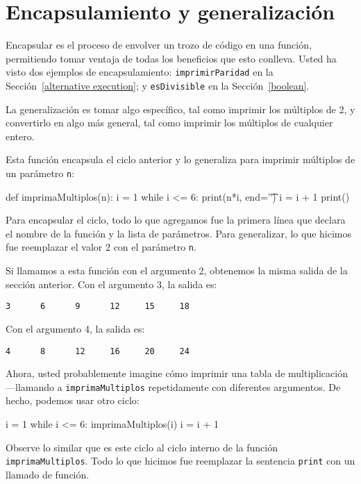 \section{Encapsulamiento y generalización}

\label{encapsulation}

  

Encapsular es el proceso de envolver un trozo de código en una función,
permitiendo tomar ventaja de todas los beneficios que esto conlleva.
Usted ha visto dos ejemplos de encapsulamiento: \texttt{imprimirParidad}
en la Sección~\ref{alternative execution}; y \texttt{esDivisible}
en la Sección~\ref{boolean}.

La generalización es tomar algo específico, tal como imprimir los
múltiplos de 2, y convertirlo en algo más general, tal como imprimir
los múltiplos de cualquier entero.

Esta función encapsula el ciclo anterior y lo generaliza para imprimir
múltiplos de un parámetro \texttt{n}:
\begin{pythoncode}
def imprimaMultiplos(n):
  i = 1
  while i <= 6:
    print(n*i, end='\t')
    i = i + 1
  print()
\end{pythoncode}

Para encapsular el ciclo, todo lo que agregamos fue la primera línea
que declara el nombre de la función y la lista de parámetros. Para
generalizar, lo que hicimos fue reemplazar el valor 2 con el parámetro
\texttt{n}.

Si llamamos a esta función con el argumento 2, obtenemos la misma
salida de la sección anterior. Con el argumento 3, la salida es:
\begin{verbatim}
3      6      9      12     15     18
\end{verbatim}
Con el argumento 4, la salida es:
\begin{verbatim}
4      8      12     16     20     24
\end{verbatim}
Ahora, usted probablemente imagine cómo imprimir una tabla de multiplicación
—llamando a \texttt{imprimaMultiplos} repetidamente con diferentes
argumentos. De hecho, podemos usar otro ciclo:

\begin{pythoncode}
i = 1
while i <= 6:
  imprimaMultiplos(i)
  i = i + 1
\end{pythoncode}

Observe lo similar que es este ciclo al ciclo interno de la función
\texttt{imprimaMultiplos}. Todo lo que hicimos fue reemplazar la sentencia
\texttt{print} con un llamado de función.

